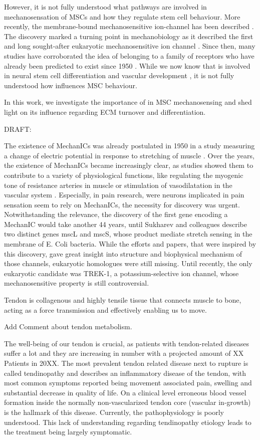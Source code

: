 However, it is not fully understood what pathways are involved in mechanosensation of MSCs and how they regulate stem cell behaviour. More recently, the membrane-bound mechanosensitive ion-channel \Piezo{} has been described \cite{Coste2010}. The discovery marked a turning point in mechanobiology as it described the first and long sought-after eukaryotic mechanosensitive ion channel \cite{Sharif-Naeini2015}. Since then, many studies have corroborated the idea of \Piezo{} belonging to a family of receptors who have already been predicted to exist since 1950 \cite{Katz1949}. While we now know that \Piezo{} is involved in neural stem cell differentiation \cite{Pathak2014} and vascular development \cite{Ranade2014}, it is not fully understood how \Piezo{} influences MSC behaviour. \par
In this work, we investigate the importance of \Piezo{} in MSC mechanosensing and shed light on its influence regarding ECM turnover and differentiation.


DRAFT: 


The existence of MechanICs was already postulated in 1950 in a study measuring a change of electric potential in response to stretching of muscle \cite{Katz1949}. Over the years, the existence of MechanICs became increasingly clear, as studies showed them to contribute to a variety of physiological functions, like regulating the myogenic tone of resistance arteries in muscle \cite{Murthy2017} or stimulation of vasodilatation in the vascular system \cite{Zeng2018}. Especially, in pain research, were neurons implicated in pain sensation seem to rely on MechanICs, the necessity for discovery was urgent. Notwithstanding the relevance, the discovery of the first gene encoding a MechanIC would take another 44 years, until Sukharev and colleagues describe two distinct genes mscL and mscS, whose product mediate stretch sensing in the membrane of E. Coli bacteria. While the efforts and papers, that were inspired by this discovery, gave great insight into structure and biophysical mechanism of those channels, eukaryotic homologues were still missing. Until recently, the only eukaryotic candidate was TREK-1, a potassium-selective ion channel, whose mechanosensitive property is still controversial. 

Tendon is collagenous and highly tensile tissue that connects muscle to bone, acting as a force transmission and effectively enabling us to move. 

Add Comment about tendon metabolism. 

The well-being of our tendon is crucial, as patients with tendon-related diseases suffer a lot and they are increasing in number with a projected amount of XX Patients in 20XX. The most prevalent tendon related disease next to rupture is called tendinopathy and describes an inflammatory disease of the tendon, with most common symptoms reported being movement associated pain, swelling and substantial decrease in quality of life. On a clinical level erroneous blood vessel formation inside the normally non-vascularized tendon core (vascular in-growth) is the hallmark of this disease. Currently, the pathophysiology is poorly understood. This lack of understanding regarding tendinopathy etiology leads to the treatment being largely symptomatic. 

